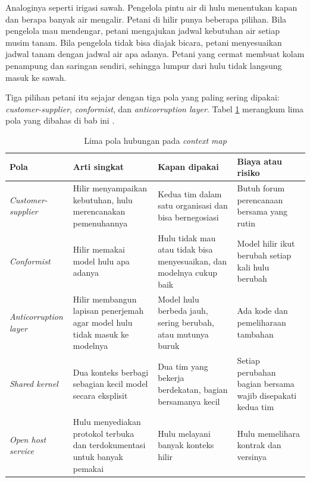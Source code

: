 Analoginya seperti irigasi sawah. Pengelola pintu air di hulu menentukan kapan dan berapa banyak
air mengalir. Petani di hilir punya beberapa pilihan. Bila pengelola mau mendengar, petani
mengajukan jadwal kebutuhan air setiap musim tanam. Bila pengelola tidak bisa diajak bicara, petani
menyesuaikan jadwal tanam dengan jadwal air apa adanya. Petani yang cermat membuat kolam penampung
dan saringan sendiri, sehingga lumpur dari hulu tidak langsung masuk ke sawah.

Tiga pilihan petani itu sejajar dengan tiga pola yang paling sering dipakai: \textit{customer-supplier},
\textit{conformist}, dan \textit{anticorruption layer}. Tabel \ref{tab:ch06-pola-hubungan}
merangkum lima pola yang dibahas di bab ini \cite{evans2003,c06-dddcrew-contextmap}.

\begin{table}[!htb]
  \centering
  \caption{Lima pola hubungan pada \textit{context map}}
  \label{tab:ch06-pola-hubungan}
  \footnotesize
  \begin{tabularx}{\textwidth}{>{\raggedright\arraybackslash}p{2.2cm} >{\raggedright\arraybackslash}X >{\raggedright\arraybackslash}X >{\raggedright\arraybackslash}X}
    \hline
    \textbf{Pola} & \textbf{Arti singkat} & \textbf{Kapan dipakai} & \textbf{Biaya atau risiko} \\
      \hline
    \textit{Customer-supplier} & Hilir menyampaikan kebutuhan, hulu merencanakan pemenuhannya &
      Kedua tim dalam satu organisasi dan bisa bernegosiasi & Butuh forum perencanaan bersama
      yang rutin \\ \hline
    \textit{Conformist} & Hilir memakai model hulu apa adanya & Hulu tidak mau atau tidak bisa
      menyesuaikan, dan modelnya cukup baik & Model hilir ikut berubah setiap kali hulu berubah
      \\ \hline
    \textit{Anticorruption layer} & Hilir membangun lapisan penerjemah agar model hulu tidak masuk
      ke modelnya & Model hulu berbeda jauh, sering berubah, atau mutunya buruk & Ada kode dan
      pemeliharaan tambahan \\ \hline
    \textit{Shared kernel} & Dua konteks berbagi sebagian kecil model secara eksplisit & Dua tim
      yang bekerja berdekatan, bagian bersamanya kecil & Setiap perubahan bagian bersama wajib
      disepakati kedua tim \\ \hline
    \textit{Open host service} & Hulu menyediakan protokol terbuka dan terdokumentasi untuk banyak
      pemakai & Hulu melayani banyak konteks hilir & Hulu memelihara kontrak dan versinya \\
      \hline
  \end{tabularx}
\end{table}

